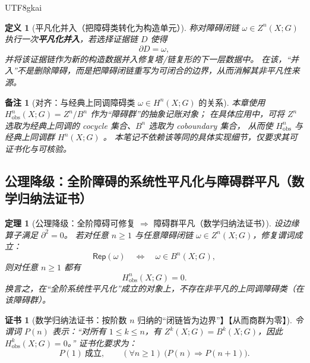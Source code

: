 \documentclass[12pt]{article}
\newtheorem{definition}{定义}[section]
\newtheorem{theorem}{定理}[section]
\newtheorem{remark}{备注}[section]
\newtheorem{Certificate}{证书}[section]
\newcommand{\KouJing}{\texorpdfstring{表述约定}{表述约定}}
\begin{document}
\begin{CJK*}{UTF8}{gkai}
\begin{definition}[平凡化并入（把障碍类转化为构造单元）]
称对障碍闭链 $\omega\in Z^n(X;G)$ 执行一次\textbf{平凡化并入}，若选择证据链 $D$ 使得
\[
  \partial D=\omega,
\]
并将该证据链作为新的构造数据并入修复塔/链复形的下一层数据中。
在该，“并入”不是删除障碍，而是把障碍闭链重写为可闭合的边界，从而消解其非平凡性来源。
\end{definition}

\begin{remark}[对齐：与经典上同调障碍类 $\omega\in H^n(X;G)$ 的关系]
本章使用 $H^n_{\mathrm{obs}}(X;G)=Z^n/B^n$ 作为“障碍群”的抽象记账对象；
在具体应用中，可将 $Z^n$ 选取为经典上同调的 cocycle 集合、$B^n$ 选取为 coboundary 集合，
从而使 $H^n_{\mathrm{obs}}$ 与经典上同调群 $H^n(X;G)$ 。
本笔记不依赖该等同的具体实现细节，仅要求其可证书化与可核验。
\end{remark}

\subsection{公理降级：全阶障碍的系统性平凡化与障碍群平凡（数学归纳法证书）}
\label{subsec:tex29-core-meta-trivialization}

\begin{theorem}[公理降级：全阶障碍可修复 $\Rightarrow$ 障碍群平凡（数学归纳法证书）]
\label{thm:tex29-core-meta-trivialization}
设边缘算子满足 $\partial^2=0$。
若对任意 $n\ge 1$ 与任意障碍闭链 $\omega\in Z^n(X;G)$，修复谓词成立：
\[
  \mathsf{Rep}(\omega)\quad\Longleftrightarrow\quad \omega\in B^n(X;G),
\]
则对任意 $n\ge 1$ 都有
\[
  H^n_{\mathrm{obs}}(X;G)=0.
\]
换言之，在“全阶系统性平凡化”成立的对象上，不存在非平凡的上同调障碍类（在该障碍群）。
\end{theorem}

\begin{Certificate}[数学归纳法证书：按阶数 $n$ 归纳的“闭链皆为边界”】【从而商群为零】]
\label{cert:tex29-core-meta-trivialization}
令谓词 $P(n)$ 表示：“对所有 $1\le k\le n$，有 $Z^k(X;G)=B^k(X;G)$，因此 $H^k_{\mathrm{obs}}(X;G)=0$。”
证书化要求为：
\[
  P(1)\ \text{成立},\qquad (\forall n\ge 1)\ \bigl(P(n)\Rightarrow P(n+1)\bigr).
\]
\end{Certificate}


\end{CJK*}
\end{document}
